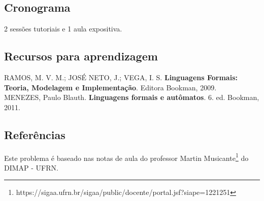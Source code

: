 \subsection{Cronograma}

2 sessões tutoriais e 1 aula expositiva.

\subsection{\large{Recursos para aprendizagem}}

RAMOS, M. V. M.; JOSÉ NETO, J.; VEGA, I. S. \textbf{Linguagens Formais: Teoria, Modelagem e Implementação}. Editora Bookman, 2009.\\

\noindent
MENEZES, Paulo Blauth. \textbf{Linguagens formais e autômatos}. 6. ed. Bookman, 2011.\\

\subsection*{Referências}

Este problema é baseado nas notas de aula do professor Martin Musicante\footnote{\scriptsize{https://sigaa.ufrn.br/sigaa/public/docente/portal.jsf?siape=1221251}} do DIMAP - UFRN.

